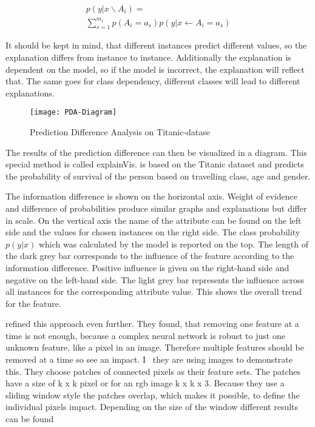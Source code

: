         \begin{multline}
            p(y|x \backslash A_{i}) = \\ 
            \sum_{s=1}^{m_{i}} p(A_{i} = a_{s})p(y|x \leftarrow A_{i} = a_{s})
        \end{multline}
        \par

It should be kept in mind, that different instances predict different values, so the explanation differs from instance to instance. Additionally the explanation is dependent on the model, so if the model is incorrect, the explanation will reflect that. The same goes for class dependency, different classes will lead to different explanations.
\begin{figure*}[h]
    \center
    \texttt{[image: PDA-Diagram]}
    \caption{Prediction Difference Analysis on Titanic-datase~ \cite{RobnikSikonja.2008}}
    \label{fig:PDA-titanic}
\end{figure*}
The results of the prediction difference can then be visualized in a diagram. This special method is called explainVis.  is based on the Titanic dataset and predicts the probability of survival of the person based on travelling class, age and gender.
\par
The information difference is shown on the horizontal axis. Weight of evidence and difference of probabilities produce similar graphs and explanations but differ in scale. On the vertical axis the name of the attribute can be found on the left side and the values for chosen instances on the right side. The class probability 
\(p(y|x)\)
 which was calculated by the model is reported on the top.
The length of the dark grey bar corresponds to the influence of the feature according to the information difference. Positive influence is given on the right-hand side and negative on the left-hand side. The light grey bar represents the influence across all instances for the corresponding attribute value. This shows the overall trend for the feature.
\par
{} refined this approach even further. They found, that removing one feature at a time is not enough, because a complex neural network is robust to just one unknown feature, like a pixel in an image. Therefore multiple features should be removed at a time so see an impact. I~ \cite{Zintgraf.2017} they are using images to demonstrate this. They choose patches of connected pixels as their feature sets. The patches have a size of k x k pixel or for an rgb image k x k x 3. Because they use a sliding window style the patches overlap, which makes it possible, to define the individual pixels impact. Depending on the size of the window different results can be found 
